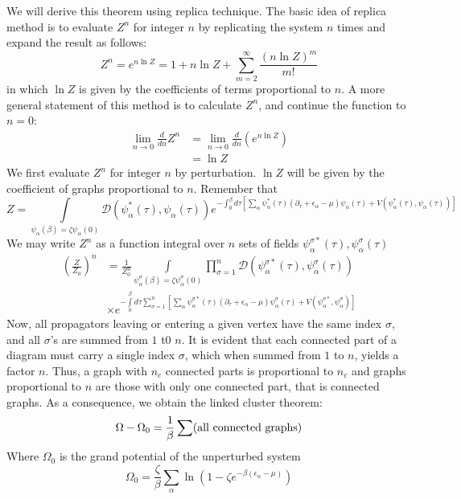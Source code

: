 \documentclass[12pt]{article}
\begin{document}
We will derive this theorem using replica technique. The basic idea of replica 
method is to evaluate $Z^n$ for integer $n$ by replicating the system $n$ 
times and expand the result as follows:
\begin{equation*}
    Z^n=e^{n\ln Z}=1+n\ln Z+\sum_{m=2}^\infty\frac{(n\ln Z)^m}{m!}
\end{equation*} 
in which $\ln Z$ is given by the coefficients of terms proportional to $n$. 
A more general statement of this method is to calculate $Z^n$, and continue 
the function to $n=0$:
\begin{equation*}
    \begin{split}
        \lim_{n\rightarrow0}\frac{d}{dn}Z^n&=\lim_{n\rightarrow0}\frac{d}{dn}
        (e^{n\ln Z})\\
        &=\ln Z
    \end{split}
\end{equation*}
We first evaluate $Z^n$ for integer $n$ by perturbation. $\ln Z$ will be given 
by the coefficient of graphs proportional to $n$. Remember that
\begin{equation*}
    Z=\int\limits_{\psi_\alpha(\beta)=\zeta\psi_\alpha(0)}\mathcal{D}
    (\psi^*_\alpha(\tau),\psi_\alpha(\tau))e^{-\int_0^\beta d\tau[\sum_\alpha
    \psi^*_\alpha(\tau)(\partial_\tau+\epsilon_\alpha-\mu)\psi_\alpha(\tau)+
    V(\psi^*_\alpha(\tau),\psi_\alpha(\tau))]}
\end{equation*}
We may write $Z^n$ as a function integral over $n$ sets of fields 
${\psi^{\sigma*}_\alpha(\tau),\psi^\sigma_\alpha(\tau)}$
\begin{equation*}
    \begin{split}
        (\frac{Z}{Z_0})^n&=\frac{1}{Z_0^n}\int\limits_{\psi^\sigma_\alpha(\beta)
        =\zeta\psi^\sigma_\alpha(0)}\prod_{\sigma=1}^n\mathcal{D}
        (\psi^{\sigma*}_\alpha(\tau),\psi^\sigma_\alpha(\tau))\\
        &\times e^{-\int\limits_0^\beta d\tau\sum_{\sigma=1}^n[\sum_\alpha\psi^{\sigma*}
        _\alpha(\tau)(\partial_\tau+\epsilon_\alpha-\mu)\psi^\sigma_\alpha(\tau)
        +V(\psi^{\sigma*}_\alpha,\psi^\sigma_\alpha)]}
    \end{split}
\end{equation*}
Now, all propagators leaving or entering a given vertex have the same index 
$\sigma$, and all $\sigma$'s are summed from $1$ t0 $n$. It is evident that 
each connected part of a diagram must carry a single index $\sigma$, which when 
summed from $1$ to $n$, yields a factor $n$. Thus, a graph with $n_c$ connected 
parts is proportional to $n_c$ and graphs proportional to $n$ are those with 
only one connected part, that is connected graphs. As a consequence, we obtain 
the linked cluster theorem:
\begin{equation*}
    \Omega-\Omega_0=\frac{1}{\beta}\sum(\rm all\ connected\ graphs)
\end{equation*} 
Where $\Omega_0$ is the grand potential of the unperturbed system
\begin{equation*}
    \Omega_0=\frac{\zeta}{\beta}\sum_\alpha\ln(1-\zeta e^{-\beta(\epsilon_\alpha
    -\mu)})
\end{equation*}
\end{document}
